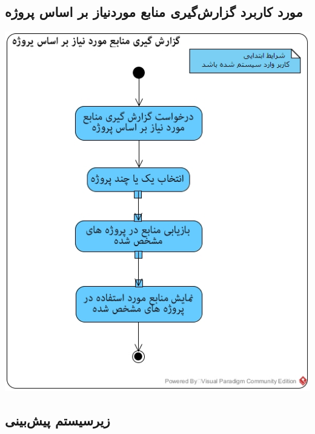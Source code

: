 \documentclass{article}
\begin{document}
\subsection*{مورد کاربرد گزارش‌گیری منابع موردنیاز بر اساس پروژه}
\vspace{2cm}
\begin{center}
\includegraphics[width=\textwidth]{ActivityDiagrams/42.jpg}
\end{center}


\newpage
\subsection{زیرسیستم پیش‌بینی}

\vspace{2cm}
\end{document}
